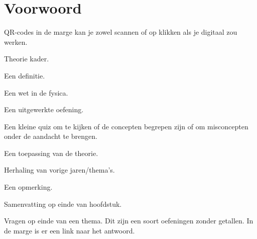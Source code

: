{\chapter*{Voorwoord}
QR-codes in de marge kan je zowel scannen of op klikken als je digitaal zou werken. \begin{marginfigure}
	\begin{center}
	\end{center}
	\vspace*{-5mm}
	\caption*{\scriptsize Link naar PHET fysica simulaties.}
\end{marginfigure}
\begin{theorie}
Theorie kader.
\end{theorie}
\begin{definitie}
Een definitie.
\end{definitie}
\begin{wet}
Een wet in de fysica.
\end{wet}
\begin{voorbeeld}
Een uitgewerkte oefening.
\end{voorbeeld}
\begin{quiz}\label{q: voorwoord} 
Een kleine quiz om te kijken of de concepten begrepen zijn of om misconcepten onder de aandacht te brengen.
\end{quiz}
\begin{toepassing}
Een toepassing van de theorie.
\end{toepassing}
\begin{her}
Herhaling van vorige jaren/thema's.
\end{her}
\begin{opm}
Een opmerking.
\end{opm}
\begin{samenvatting}
Samenvatting op einde van hoofdstuk.
\end{samenvatting}
\begin{vraag}\label{vH0:vb}
Vragen op einde van een thema. Dit zijn een soort oefeningen zonder getallen. In de marge is er een link naar het antwoord.
\end{vraag}
\begin{oef}\label{oH0:vb}

\end{oef}}
